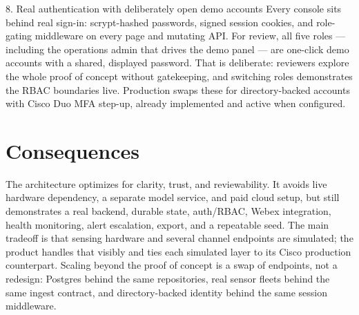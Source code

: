\documentclass[10pt,a4paper]{article}
\begin{document}
\begin{decisionbox}{8. Real authentication with deliberately open demo accounts}
Every console sits behind real sign-in: scrypt-hashed passwords, signed session cookies, and role-gating middleware on every page and mutating API. For review, all five roles --- including the operations admin that drives the demo panel --- are one-click demo accounts with a shared, displayed password. That is deliberate: reviewers explore the whole proof of concept without gatekeeping, and switching roles demonstrates the RBAC boundaries live. Production swaps these for directory-backed accounts with Cisco Duo MFA step-up, already implemented and active when configured.
\end{decisionbox}

\section*{Consequences}

The architecture optimizes for clarity, trust, and reviewability. It avoids live hardware dependency, a separate model service, and paid cloud setup, but still demonstrates a real backend, durable state, auth/RBAC, Webex integration, health monitoring, alert escalation, export, and a repeatable seed. The main tradeoff is that sensing hardware and several channel endpoints are simulated; the product handles that visibly and ties each simulated layer to its Cisco production counterpart. Scaling beyond the proof of concept is a swap of endpoints, not a redesign: Postgres behind the same repositories, real sensor fleets behind the same ingest contract, and directory-backed identity behind the same session middleware.
\end{document}
